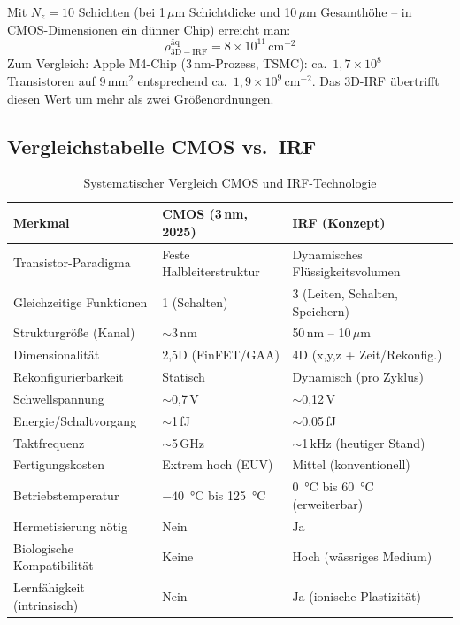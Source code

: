 ﻿\documentclass[a4paper,12pt]{scrreprt}
\theoremstyle{definition}
\begin{document}
Mit $N_z = 10$ Schichten (bei 1\,$\mu$m Schichtdicke und 10\,$\mu$m Gesamthöhe --
in CMOS-Dimensionen ein dünner Chip) erreicht man:
\begin{equation}
	\rho_{\mathrm{3D-IRF}}^{\mathrm{äq}} = 8 \times 10^{11}\,\text{cm}^{-2}
	\label{eq:dichte_beispiel}
\end{equation}
Zum Vergleich: Apple M4-Chip (3\,nm-Prozess, TSMC): ca.\ $1{,}7 \times 10^{8}$ Transistoren
auf 9\,mm$^2$ entsprechend ca.\ $1{,}9 \times 10^{9}$\,cm$^{-2}$. Das 3D-IRF übertrifft
diesen Wert um mehr als zwei Größenordnungen.

\subsection{Vergleichstabelle CMOS vs.\ IRF}

\begin{table}[H]
	\centering
	\caption{Systematischer Vergleich CMOS und IRF-Technologie}
	\label{tab:vergleich_cmos_irf}
	\begin{tabular}{p{4.2cm}p{4.5cm}p{4.5cm}}
		\toprule
		\textbf{Merkmal} & \textbf{CMOS (3\,nm, 2025)} & \textbf{IRF (Konzept)} \\
		\midrule
		Transistor-Paradigma & Feste Halbleiterstruktur & Dynamisches Flüssigkeitsvolumen \\
		Gleichzeitige Funktionen & 1 (Schalten) & 3 (Leiten, Schalten, Speichern) \\
		Strukturgröße (Kanal) & $\sim$3\,nm & 50\,nm -- 10\,$\mu$m \\
		Dimensionalität & 2{,}5D (FinFET/GAA) & 4D (x,y,z + Zeit/Rekonfig.) \\
		Rekonfigurierbarkeit & Statisch & Dynamisch (pro Zyklus) \\
		Schwellspannung & $\sim$0{,}7\,V & $\sim$0{,}12\,V \\
		Energie/Schaltvorgang & $\sim$1\,fJ & $\sim$0{,}05\,fJ \\
		Taktfrequenz & $\sim$5\,GHz & $\sim$1\,kHz (heutiger Stand) \\
		Fertigungskosten & Extrem hoch (EUV) & Mittel (konventionell) \\
		Betriebstemperatur & $-40$\, °C bis 125\, °C & $0$\, °C bis 60\, °C (erweiterbar) \\
		Hermetisierung nötig & Nein & Ja \\
		Biologische Kompatibilität & Keine & Hoch (wässriges Medium) \\
		Lernfähigkeit (intrinsisch) & Nein & Ja (ionische Plastizität) \\
		\bottomrule
	\end{tabular}
\end{table}
\end{document}
